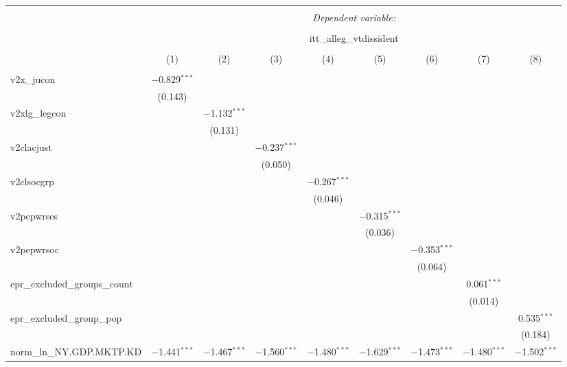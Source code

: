
\begin{sidewaystable}[!htbp] \centering 
  \caption{} 
  \label{} 
\tiny 
\begin{tabular}{@{\extracolsep{5pt}}lcccccccc} 
\\[-1.8ex]\hline 
\hline \\[-1.8ex] 
 & \multicolumn{8}{c}{\textit{Dependent variable:}} \\ 
\cline{2-9} 
\\[-1.8ex] & \multicolumn{8}{c}{itt\_alleg\_vtdissident} \\ 
\\[-1.8ex] & (1) & (2) & (3) & (4) & (5) & (6) & (7) & (8)\\ 
\hline \\[-1.8ex] 
 v2x\_jucon & $-$0.829$^{***}$ &  &  &  &  &  &  &  \\ 
  & (0.143) &  &  &  &  &  &  &  \\ 
  v2xlg\_legcon &  & $-$1.132$^{***}$ &  &  &  &  &  &  \\ 
  &  & (0.131) &  &  &  &  &  &  \\ 
  v2clacjust &  &  & $-$0.237$^{***}$ &  &  &  &  &  \\ 
  &  &  & (0.050) &  &  &  &  &  \\ 
  v2clsocgrp &  &  &  & $-$0.267$^{***}$ &  &  &  &  \\ 
  &  &  &  & (0.046) &  &  &  &  \\ 
  v2pepwrses &  &  &  &  & $-$0.315$^{***}$ &  &  &  \\ 
  &  &  &  &  & (0.036) &  &  &  \\ 
  v2pepwrsoc &  &  &  &  &  & $-$0.353$^{***}$ &  &  \\ 
  &  &  &  &  &  & (0.064) &  &  \\ 
  epr\_excluded\_groups\_count &  &  &  &  &  &  & 0.061$^{***}$ &  \\ 
  &  &  &  &  &  &  & (0.014) &  \\ 
  epr\_excluded\_group\_pop &  &  &  &  &  &  &  & 0.535$^{***}$ \\ 
  &  &  &  &  &  &  &  & (0.184) \\ 
  norm\_ln\_NY.GDP.MKTP.KD & $-$1.441$^{***}$ & $-$1.467$^{***}$ & $-$1.560$^{***}$ & $-$1.480$^{***}$ & $-$1.629$^{***}$ & $-$1.473$^{***}$ & $-$1.480$^{***}$ & $-$1.502$^{***}$ \\ 

\end{tabular}
\end{sidewaystable}
